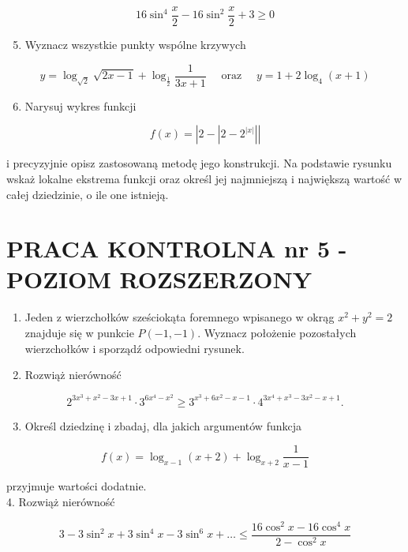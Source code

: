 \documentclass[10pt]{article}
\begin{document}
$$
16 \sin ^{4} \frac{x}{2}-16 \sin ^{2} \frac{x}{2}+3 \geqslant 0
$$

\begin{enumerate}
  \setcounter{enumi}{4}
  \item Wyznacz wszystkie punkty wspólne krzywych
\end{enumerate}

$$
y=\log _{\sqrt{2}} \sqrt{2 x-1}+\log _{\frac{1}{2}} \frac{1}{3 x+1} \quad \text { oraz } \quad y=1+2 \log _{4}(x+1)
$$

\begin{enumerate}
  \setcounter{enumi}{5}
  \item Narysuj wykres funkcji
\end{enumerate}

$$
f(x)=\left|2-\left|2-2^{|x|}\right|\right|
$$

i precyzyjnie opisz zastosowaną metodę jego konstrukcji. Na podstawie rysunku wskaż lokalne ekstrema funkcji oraz określ jej najmniejszą i największą wartość w całej dziedzinie, o ile one istnieją.

\section*{PRACA KONTROLNA nr 5 - POZIOM ROZSZERZONY}
\begin{enumerate}
  \item Jeden z wierzchołków sześciokąta foremnego wpisanego w okrąg $x^{2}+y^{2}=2$ znajduje się w punkcie $P(-1,-1)$. Wyznacz położenie pozostałych wierzchołków i sporządź odpowiedni rysunek.
  \item Rozwiąż nierówność
\end{enumerate}

$$
2^{3 x^{3}+x^{2}-3 x+1} \cdot 3^{6 x^{4}-x^{2}} \geqslant 3^{x^{3}+6 x^{2}-x-1} \cdot 4^{3 x^{4}+x^{3}-3 x^{2}-x+1} .
$$

\begin{enumerate}
  \setcounter{enumi}{2}
  \item Określ dziedzinę i zbadaj, dla jakich argumentów funkcja
\end{enumerate}

$$
f(x)=\log _{x-1}(x+2)+\log _{x+2} \frac{1}{x-1}
$$

przyjmuje wartości dodatnie.\\
4. Rozwiąż nierówność

$$
3-3 \sin ^{2} x+3 \sin ^{4} x-3 \sin ^{6} x+\ldots \leqslant \frac{16 \cos ^{2} x-16 \cos ^{4} x}{2-\cos ^{2} x}
$$
\end{document}
